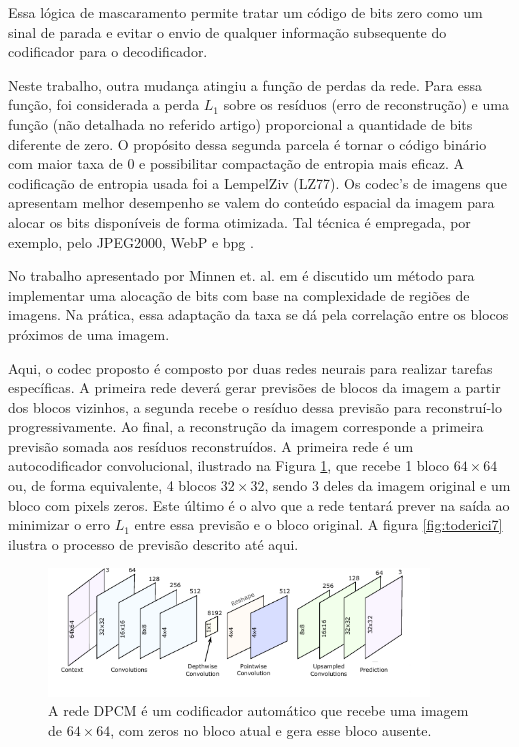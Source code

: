 Essa lógica de mascaramento permite tratar um código de bits zero como um sinal de parada e evitar o envio de qualquer informação subsequente do codificador para o decodificador.   

Neste trabalho, outra mudança atingiu a função de perdas da rede. Para essa função, foi considerada a perda $L_1$ sobre os resíduos (erro de reconstrução) e uma função (não detalhada no referido artigo) proporcional a quantidade de bits diferente de zero. O propósito dessa segunda parcela  é tornar o código binário com maior taxa de 0 e possibilitar compactação de entropia mais eficaz. A codificação de entropia usada foi a LempelZiv (LZ77). 
Os \acrshort{codec}'s de imagens que apresentam melhor desempenho se valem do conteúdo espacial da imagem para alocar os bits disponíveis de forma otimizada. Tal técnica é empregada, por exemplo, pelo JPEG2000, WebP e \acrshort{bpg} \cite{boliek2000information}.

No trabalho apresentado por Minnen et. al. em \cite{SpatiallyAdaptive2018Minnen} é discutido um método para implementar uma alocação de bits com base na complexidade de regiões de imagens. Na prática, essa adaptação da taxa se dá pela correlação entre os blocos próximos de uma imagem. 


Aqui, o \acrshort{codec} proposto é composto por duas redes neurais para realizar tarefas específicas. A primeira rede deverá gerar previsões de blocos da imagem a partir dos blocos vizinhos, a segunda recebe o resíduo dessa previsão para reconstruí-lo progressivamente. 
Ao final, a reconstrução da imagem corresponde a primeira previsão somada aos resíduos reconstruídos. A primeira rede é um autocodificador convolucional, ilustrado na Figura \ref{fig:toderici8}, que recebe 1 bloco $64 \times 64$ ou, de forma equivalente, 4 blocos $32 \times 32$, sendo 3 deles da imagem original e um bloco com pixels zeros. Este último é o alvo que a rede tentará prever na saída ao minimizar o erro $L_1$ entre essa previsão e o bloco original.  A figura \ref{fig:toderici7} ilustra o processo de previsão descrito até aqui.     


\begin{figure}
	\centering
	\includegraphics[width=0.90\textwidth]{figuras/toderici_8.pdf}
	\caption[Modelo DPCM com autocodificador]{A rede DPCM é um codificador automático que recebe uma imagem de $64 \times 64$, com zeros no bloco atual e gera esse bloco ausente\cite{SpatiallyAdaptive2018Minnen}.}
	\label{fig:toderici8}
\end{figure}

